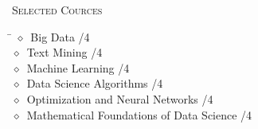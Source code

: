 \documentclass[11pt, a4paper]{article}
\newcommand{\smaller}[1]{{\small$\diamond$\ #1}}
\newcommand{\headright}[1]{\vspace*{2.5ex}\textsc{\Large\color{cvblue}#1}\par%
     \vspace*{-2ex}{\color{cvblue}\hrulefill}\par}
\begin{document}
\begin{minipage}[t]{0.56\textwidth}
\headright{Selected Cources}
    
	\begin{tabbing}
    \hspace{10cm} \= \kill
    \smaller{Big Data} /4 \\[0.2cm]
    \smaller{Text Mining} /4 \\[0.2cm]
    \smaller{Machine Learning} /4 \\[0.2cm]
    \smaller{Data Science Algorithms} /4 \\[0.2cm]
    \smaller{Optimization and Neural Networks} /4 \\[0.2cm]
    \smaller{Mathematical Foundations of Data Science} /4 \\[0.2cm]
    \end{tabbing}

\end{minipage}
\end{document}
